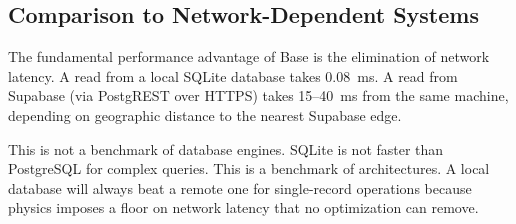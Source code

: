 \subsection{Comparison to Network-Dependent Systems}

The fundamental performance advantage of Base is the elimination of network
latency. A read from a local SQLite database takes 0.08~ms. A read from
Supabase (via PostgREST over HTTPS) takes 15--40~ms from the same machine,
depending on geographic distance to the nearest Supabase edge.

\begin{center}
\end{center}

This is not a benchmark of database engines. SQLite is not faster than
PostgreSQL for complex queries. This is a benchmark of architectures. A local
database will always beat a remote one for single-record operations because
physics imposes a floor on network latency that no optimization can remove.

